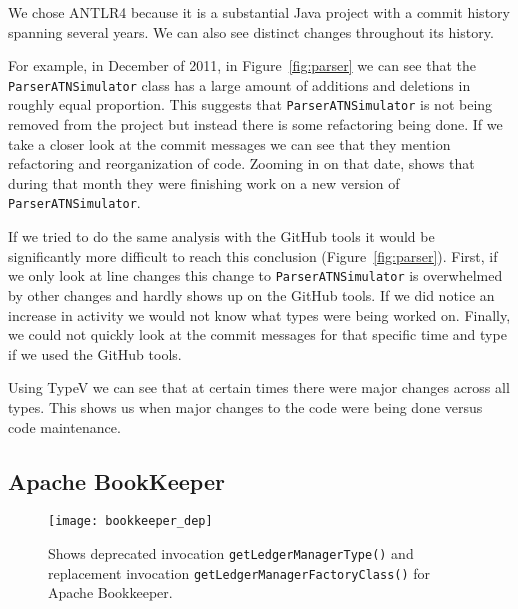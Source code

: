 We chose ANTLR4 because it is a substantial Java project with a commit history spanning several years. We can also see distinct changes throughout its history.

For example, in December of 2011, in Figure~\ref{fig:parser} we can see that the \texttt{ParserATNSimulator} class has a large amount of additions and deletions in roughly equal proportion. This suggests that \texttt{ParserATNSimulator} is not being removed from the project but instead there is some refactoring being done. If we take a closer look at the commit messages we can see that they mention refactoring and reorganization of code. Zooming in on that date,  shows that during that month they were finishing work on a new version of \texttt{ParserATNSimulator}.

If we tried to do the same analysis with the GitHub tools it would be significantly more difficult to reach this conclusion (Figure~\ref{fig:parser}). First, if we only look at line changes this change to \texttt{ParserATNSimulator} is overwhelmed by other changes and hardly shows up on the GitHub tools. If we did notice an increase in activity we would not know what types were being worked on. Finally, we could not quickly look at the commit messages for that specific time and type if we used the GitHub tools.

Using TypeV we can see that at certain times there were major changes across all types. This shows us when major changes to the code were being done versus code maintenance.

\subsection{Apache BookKeeper}

\begin{figure}[!ht]
\centering
\texttt{[image: bookkeeper\_dep]}
\caption{Shows deprecated invocation \texttt{getLedgerManagerType()} and replacement invocation \texttt{getLedgerManagerFactoryClass()} for Apache Bookkeeper.}
\label{fig:bookkeeper-depr}
\end{figure}

